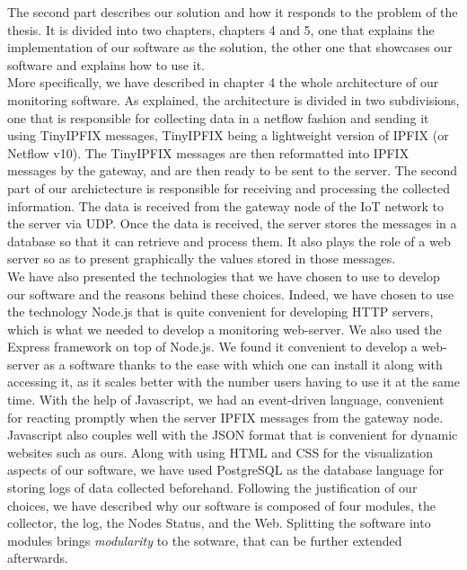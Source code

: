 The second part describes our solution and how it responds to the problem of the thesis. It is divided into two chapters, chapters 4 and 5, one that explains the implementation of our software as the solution, the other one that showcases our software and explains how to use it.\\

More specifically, we have described in chapter 4 the whole architecture of our monitoring software. As explained, the architecture is divided in two subdivisions, one that is responsible for collecting data in a netflow fashion and sending it using TinyIPFIX messages, TinyIPFIX being a lightweight version of IPFIX (or Netflow v10). The TinyIPFIX messages are then reformatted into IPFIX messages by the gateway, and are then ready to be sent to the server. The second part of our archictecture is responsible for receiving and processing the collected information. The data is received from the gateway node of the IoT network to the server via UDP. Once the data is received, the server stores the messages in a database so that it can retrieve and process them. It also plays the role of a web server so as to present graphically the values stored in those messages. \\

We have also presented the technologies that we have chosen to use to develop our software and the reasons behind these choices. Indeed, we have chosen to use the technology Node.js that is quite convenient for developing HTTP servers, which is what we needed to develop a monitoring web-server. We also used the Express framework on top of Node.js. We found it convenient to develop a web-server as a software thanks to the ease with which one can install it along with accessing it, as it scales better with the number users having to use it at the same time. With the help of Javascript, we had an event-driven language, convenient for reacting promptly when the server IPFIX messages from the gateway node. Javascript also couples well with the JSON format that is convenient for dynamic websites such as ours. Along with using HTML and CSS for the visualization aspects of our software, we have used PostgreSQL as the database language for storing logs of data collected beforehand. Following the justification of our choices, we have described why our software is composed of four modules, the collector, the log, the Nodes Status, and the Web. Splitting the software into modules brings \textit{modularity} to the sotware, that can be further extended afterwards.\\

